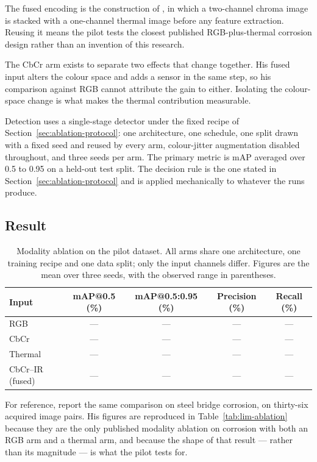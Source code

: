 The fused encoding is the construction of \citet{Lim2021}, in which a
two-channel chroma image is stacked with a one-channel thermal image before any
feature extraction. Reusing it means the pilot tests the closest published
RGB-plus-thermal corrosion design rather than an invention of this research.

The CbCr arm exists to separate two effects that \citet{Lim2021} change
together. His fused input alters the colour space and adds a sensor in the same
step, so his comparison against RGB cannot attribute the gain to either.
Isolating the colour-space change is what makes the thermal contribution
measurable.

Detection uses a single-stage detector \citep{Ultralytics2023} under the fixed
recipe of Section~\ref{sec:ablation-protocol}: one architecture, one schedule,
one split drawn with a fixed seed and reused by every arm, colour-jitter
augmentation disabled throughout, and three seeds per arm. The primary metric is
mAP averaged over 0.5 to 0.95 on a held-out test split. The decision rule is the
one stated in Section~\ref{sec:ablation-protocol} and is applied mechanically to
whatever the runs produce.

\subsection{Result}

\begin{table}[htbp]
\centering
\caption{Modality ablation on the pilot dataset. All arms share one
architecture, one training recipe and one data split; only the input channels
differ. Figures are the mean over three seeds, with the observed range in
parentheses.}
\label{tab:prelim-ablation}
\begin{tabular}{@{}lcccc@{}}
\toprule
\textbf{Input} & \textbf{mAP@0.5 (\%)} & \textbf{mAP@0.5:0.95 (\%)} & \textbf{Precision (\%)} & \textbf{Recall (\%)} \\
\midrule
RGB & --- & --- & --- & --- \\
CbCr & --- & --- & --- & --- \\
Thermal & --- & --- & --- & --- \\
CbCr--IR (fused) & --- & --- & --- & --- \\
\bottomrule
\end{tabular}
\end{table}

For reference, \citet{Lim2021} report the same comparison on steel bridge
corrosion, on thirty-six acquired image pairs. His figures are reproduced in
Table~\ref{tab:lim-ablation} because they are the only published modality
ablation on corrosion with both an RGB arm and a thermal arm, and because the
shape of that result --- rather than its magnitude --- is what the pilot tests
for.

